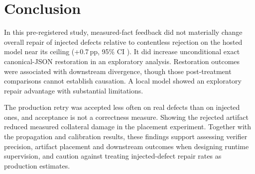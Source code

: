 \section{Conclusion}
\label{sec:conclusion}

In this pre-registered study, measured-fact feedback did not materially change
overall repair of injected defects relative to contentless rejection on the
hosted model near its ceiling (+0.7\,pp, 95\% CI ). It did
increase unconditional exact canonical-JSON restoration in an exploratory
analysis. Restoration outcomes were associated with downstream divergence,
though those post-treatment comparisons cannot establish causation. A local
model showed an exploratory repair advantage with substantial limitations.

The production retry was accepted less often on real defects than on injected
ones, and acceptance is not a correctness measure. Showing the rejected artifact
reduced measured collateral damage in the placement experiment. Together with
the propagation and calibration results, these findings support assessing
verifier precision, artifact placement and downstream outcomes when designing
runtime supervision, and caution against treating injected-defect repair rates
as production estimates.
